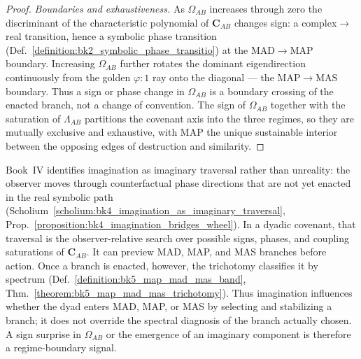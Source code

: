 \begin{proof}
\emph{Boundaries and exhaustiveness.} As $\Omega_{AB}$ increases through zero the discriminant of the characteristic polynomial of $\mathbf{C}_{AB}$ changes sign: a complex$\to$real transition, hence a symbolic phase transition (Def.~\ref{definition:bk2_symbolic_phase_transitio}) at the $\mathrm{MAD}\!\to\!\mathrm{MAP}$ boundary. Increasing $\Omega_{AB}$ further rotates the dominant eigendirection continuously from the golden $\varphi{:}1$ ray onto the diagonal --- the $\mathrm{MAP}\!\to\!\mathrm{MAS}$ boundary. Thus a sign or phase change in $\Omega_{AB}$ is a boundary crossing of the enacted branch, not a change of convention. The sign of $\Omega_{AB}$ together with the saturation of $\Lambda_{AB}$ partitions the covenant axis into the three regimes, so they are mutually exclusive and exhaustive, with MAP the unique sustainable interior between the opposing edges of destruction and similarity.
\end{proof}

\begin{scholium}
\label{scholium:bk5_imagination_covenant_branch_selection}
Book~IV identifies imagination as imaginary traversal rather than unreality: the observer moves through counterfactual phase directions that are not yet enacted in the real symbolic path (Scholium~\ref{scholium:bk4_imagination_as_imaginary_traversal}, Prop.~\ref{proposition:bk4_imagination_bridges_wheel}). In a dyadic covenant, that traversal is the observer-relative search over possible signs, phases, and coupling saturations of $\mathbf{C}_{AB}$. It can preview MAD, MAP, and MAS branches before action. Once a branch is enacted, however, the trichotomy classifies it by spectrum (Def.~\ref{definition:bk5_map_mad_mas_band}, Thm.~\ref{theorem:bk5_map_mad_mas_trichotomy}). Thus imagination influences whether the dyad enters MAD, MAP, or MAS by selecting and stabilizing a branch; it does not override the spectral diagnosis of the branch actually chosen. A sign surprise in $\Omega_{AB}$ or the emergence of an imaginary component is therefore a regime-boundary signal.
\end{scholium}

